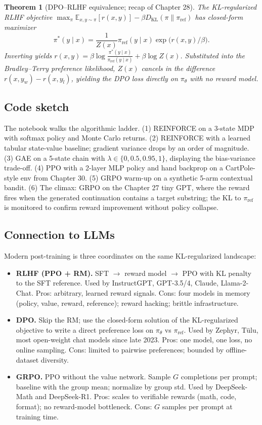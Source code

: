 \documentclass[11pt]{article}
\newtheorem{theorem}{Theorem}[section]
\theoremstyle{remark}
\begin{document}
\begin{theorem}[DPO--RLHF equivalence; recap of Chapter 28]
The KL-regularized RLHF objective $\max_\pi \mathbb{E}_{x,y\sim\pi}[r(x,y)]-\beta D_{\mathrm{KL}}(\pi\|\pi_{\mathrm{ref}})$ has closed-form maximizer
\[
\pi^*(y\mid x)=\frac{1}{Z(x)}\pi_{\mathrm{ref}}(y\mid x)\exp\!\bigl(r(x,y)/\beta\bigr).
\]
Inverting yields $r(x,y)=\beta\log\frac{\pi^*(y\mid x)}{\pi_{\mathrm{ref}}(y\mid x)}+\beta\log Z(x)$. Substituted into the Bradley--Terry preference likelihood, $Z(x)$ cancels in the difference $r(x,y_w)-r(x,y_l)$, yielding the DPO loss directly on $\pi_\theta$ with no reward model.
\end{theorem}

\subsection*{Code sketch}

The notebook walks the algorithmic ladder. (1) REINFORCE on a 3-state MDP with softmax policy and Monte Carlo returns. (2) REINFORCE with a learned tabular state-value baseline; gradient variance drops by an order of magnitude. (3) GAE on a 5-state chain with $\lambda\in\{0,0.5,0.95,1\}$, displaying the bias-variance trade-off. (4) PPO with a 2-layer MLP policy and hand backprop on a CartPole-style env from Chapter 30. (5) GRPO warm-up on a synthetic 5-arm contextual bandit. (6) The climax: GRPO on the Chapter 27 tiny GPT, where the reward fires when the generated continuation contains a target substring; the KL to $\pi_{\mathrm{ref}}$ is monitored to confirm reward improvement without policy collapse.

\subsection*{Connection to LLMs}

Modern post-training is three coordinates on the same KL-regularized landscape:

\begin{itemize}
    \item \textbf{RLHF (PPO + RM).} SFT $\to$ reward model $\to$ PPO with KL penalty to the SFT reference. Used by InstructGPT, GPT-3.5/4, Claude, Llama-2-Chat. Pros: arbitrary, learned reward signals. Cons: four models in memory (policy, value, reward, reference); reward hacking; brittle infrastructure.
    \item \textbf{DPO.} Skip the RM; use the closed-form solution of the KL-regularized objective to write a direct preference loss on $\pi_\theta$ vs $\pi_{\mathrm{ref}}$. Used by Zephyr, T\"ulu, most open-weight chat models since late 2023. Pros: one model, one loss, no online sampling. Cons: limited to pairwise preferences; bounded by offline-dataset diversity.
    \item \textbf{GRPO.} PPO without the value network. Sample $G$ completions per prompt; baseline with the group mean; normalize by group std. Used by DeepSeek-Math and DeepSeek-R1. Pros: scales to verifiable rewards (math, code, format); no reward-model bottleneck. Cons: $G$ samples per prompt at training time.
\end{itemize}
\end{document}

